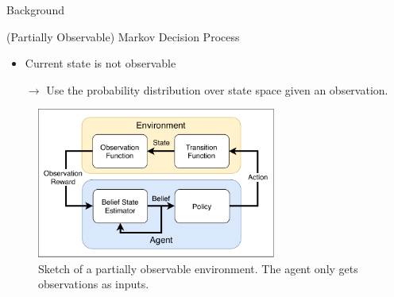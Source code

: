 \begin{exampleblock}{Background}
\begin{figure}[htp]
\end{figure}


\Large{(Partially Observable) Markov Decision Process}

\normalsize
\begin{itemize}
    \item Current state is not observable \parskip\item[$\rightarrow$]
    Use the probability distribution over state space given an observation.
\end{itemize}

\hspace{2cm}


\begin{figure}
  \centering
    \includegraphics[width=0.7\textwidth]{img/background/POMDP}
  \caption{Sketch of a partially observable environment. The agent only gets observations as inputs.}
\end{figure}






\end{exampleblock}
